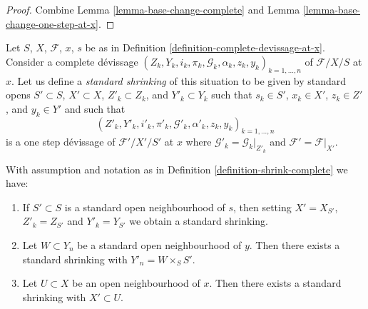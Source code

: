 \begin{proof}
Combine
Lemma \ref{lemma-base-change-complete}
and
Lemma \ref{lemma-base-change-one-step-at-x}.
\end{proof}

\begin{definition}
\label{definition-shrink-complete}
Let $S$, $X$, $\mathcal{F}$, $x$, $s$ be as in
Definition \ref{definition-complete-devissage-at-x}.
Consider a complete d\'evissage
$(Z_k, Y_k, i_k, \pi_k, \mathcal{G}_k, \alpha_k, z_k, y_k)_{k = 1, \ldots, n}$
of $\mathcal{F}/X/S$ at $x$. Let us define a
{\it standard shrinking} of this situation to be
given by standard opens $S' \subset S$, $X' \subset X$,
$Z'_k \subset Z_k$, and $Y'_k \subset Y_k$ such that $s_k \in S'$,
$x_k \in X'$, $z_k \in Z'$, and $y_k \in Y'$ and such that
$$
(Z'_k, Y'_k, i'_k, \pi'_k,
\mathcal{G}'_k, \alpha'_k, z_k, y_k)_{k = 1, \ldots, n}
$$
is a one step d\'evissage of $\mathcal{F}'/X'/S'$ at $x$ where
$\mathcal{G}'_k = \mathcal{G}_k|_{Z'_k}$ and
$\mathcal{F}' = \mathcal{F}|_{X'}$.
\end{definition}

\begin{lemma}
\label{lemma-shrink-complete}
With assumption and notation as in
Definition \ref{definition-shrink-complete}
we have:
\begin{enumerate}
\item
\label{item-shrink-base-complete}
If $S' \subset S$ is a standard open neighbourhood of $s$, then
setting $X' = X_{S'}$, $Z'_k = Z_{S'}$ and $Y'_k = Y_{S'}$ we obtain a
standard shrinking.
\item
\label{item-shrink-on-Y-complete}
Let $W \subset Y_n$ be a standard open neighbourhood of $y$.
Then there exists a standard shrinking with $Y'_n = W \times_S S'$.
\item
\label{item-shrink-on-X-complete}
Let $U \subset X$ be an open neighbourhood of $x$.
Then there exists a standard shrinking with $X' \subset U$.
\end{enumerate}
\end{lemma}

